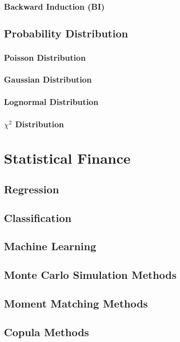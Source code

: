 \documentclass{book}
\begin{document}
\subsection{Backward Induction (BI)}

\section{Probability Distribution}
\subsection{Poisson Distribution}
\subsection{Gaussian Distribution}
\subsection{Lognormal Distribution}
\subsection{$\chi^2$ Distribution}


\chapter{Statistical Finance}
\section{Regression}
\section{Classification}
\section{Machine Learning}
\section{Monte Carlo Simulation Methods}
\section{Moment Matching Methods}
\section{Copula Methods}
\end{document}

